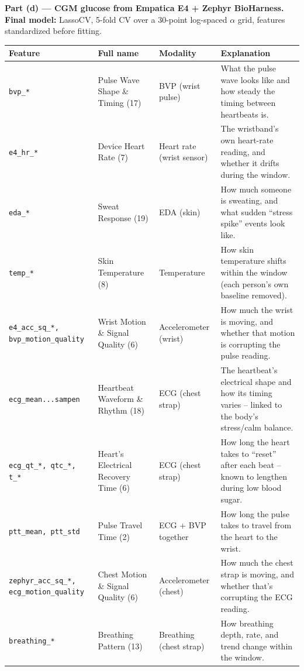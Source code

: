 \documentclass[10pt]{article}
\begin{document}
\textbf{Part (d) --- CGM glucose from Empatica E4 + Zephyr BioHarness.} \textbf{Final model:}
LassoCV, 5-fold CV over a 30-point log-spaced $\alpha$ grid, features standardized before fitting.
\begin{center}
\footnotesize
\begin{tabular}{lp{3.0cm}lp{6.4cm}}
\toprule
Feature & Full name & Modality & Explanation \\
\midrule
\texttt{bvp\_*} & Pulse Wave Shape \& Timing (17) & BVP (wrist pulse) & What the pulse wave looks like and how steady the timing between heartbeats is. \\
\texttt{e4\_hr\_*} & Device Heart Rate (7) & Heart rate (wrist sensor) & The wristband's own heart-rate reading, and whether it drifts during the window. \\
\texttt{eda\_*} & Sweat Response (19) & EDA (skin) & How much someone is sweating, and what sudden ``stress spike'' events look like. \\
\texttt{temp\_*} & Skin Temperature (8) & Temperature & How skin temperature shifts within the window (each person's own baseline removed). \\
\texttt{e4\_acc\_sq\_*, bvp\_motion\_quality} & Wrist Motion \& Signal Quality (6) & Accelerometer (wrist) & How much the wrist is moving, and whether that motion is corrupting the pulse reading. \\
\texttt{ecg\_mean...sampen} & Heartbeat Waveform \& Rhythm (18) & ECG (chest strap) & The heartbeat's electrical shape and how its timing varies -- linked to the body's stress/calm balance. \\
\texttt{ecg\_qt\_*, qtc\_*, t\_*} & Heart's Electrical Recovery Time (6) & ECG (chest strap) & How long the heart takes to ``reset'' after each beat -- known to lengthen during low blood sugar. \\
\texttt{ptt\_mean, ptt\_std} & Pulse Travel Time (2) & ECG + BVP together & How long the pulse takes to travel from the heart to the wrist. \\
\texttt{zephyr\_acc\_sq\_*, ecg\_motion\_quality} & Chest Motion \& Signal Quality (6) & Accelerometer (chest) & How much the chest strap is moving, and whether that's corrupting the ECG reading. \\
\texttt{breathing\_*} & Breathing Pattern (13) & Breathing (chest strap) & How breathing depth, rate, and trend change within the window. \\
\bottomrule
\end{tabular}
\end{center}
\end{document}
